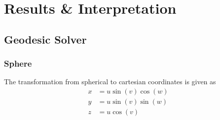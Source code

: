 \documentclass[main.tex]{subfiles}
\begin{document}
\section{Results \& Interpretation}
\label{sec:5}

\subsection{Geodesic Solver}
\subsubsection{Sphere}
The transformation from spherical to cartesian coordinates is given as
\begin{align*}
    x &= u\sin(v)\cos(w)\\
    y &= u\sin(v)\sin(w)\\
    z &= u\cos(v)\\
\end{align*}
\end{document}
